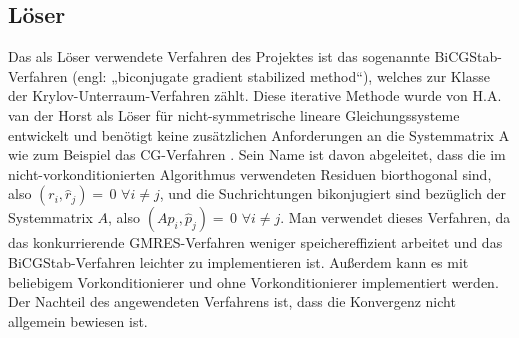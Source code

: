 \subsection{Löser}
Das als Löser verwendete Verfahren des Projektes ist das sogenannte BiCGStab-\newline Verfahren (engl: „biconjugate gradient stabilized method“), welches zur Klasse der Krylov-Unterraum-Verfahren zählt. Diese iterative Methode wurde von H.A. van der Horst als Löser für nicht-symmetrische lineare Gleichungssysteme entwickelt und benötigt keine zusätzlichen Anforderungen an die Systemmatrix A wie zum Beispiel das CG-Verfahren \cite{BiCGSTAB}. Sein Name ist davon abgeleitet, dass die im nicht-vorkonditionierten Algorithmus verwendeten Residuen biorthogonal sind, also $(r_i,\hat{r}_j)=\,0$ $\forall i\neq j$, und die Suchrichtungen bikonjugiert sind bezüglich der Systemmatrix $A$, also $(Ap_i,\hat{p}_j)=\,0$ $ \forall i \neq j$.  Man verwendet dieses Verfahren, da das konkurrierende GMRES-Verfahren weniger speichereffizient arbeitet und das BiCGStab-Verfahren leichter zu implementieren ist.  Au\ss{}erdem kann es mit beliebigem Vorkonditionierer und ohne Vorkonditionierer implementiert werden. Der Nachteil des angewendeten Verfahrens ist, dass die Konvergenz nicht allgemein bewiesen ist.  \\



